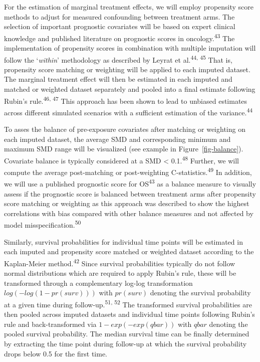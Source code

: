 \documentclass[
  letterpaper,
  DIV=11,
  numbers=noendperiod]{scrartcl}
\begin{document}
For the estimation of marginal treatment effects, we will employ
propensity score methods to adjust for measured confounding between
treatment arms. The selection of important prognostic covariates will be
based on expert clinical knowledge and published literature on
prognostic scores in oncology.\textsuperscript{43} The implementation of
propensity scores in combination with multiple imputation will follow
the `\emph{within}' methodology as described by Leyrat et
al.\textsuperscript{44, 45} That is, propensity score matching or
weighting will be applied to each imputed dataset. The marginal
treatment effect will then be estimated in each imputed and matched or
weighted dataset separately and pooled into a final estimate following
Rubin's rule.\textsuperscript{46, 47} This approach has been shown to
lead to unbiased estimates across different simulated scenarios with a
sufficient estimation of the variance.\textsuperscript{44}

To asses the balance of pre-exposure covariates after matching or
weighting on each imputed dataset, the average SMD and corresponding
minimum and maximum SMD range will be visualized (see example in
Figure~\ref{fig-balance}). Covariate balance is typically considered at
a SMD \textless{} 0.1.\textsuperscript{48} Further, we will compute the
average post-matching or post-weighting
C-statistics.\textsuperscript{49} In addition, we will use a published
prognostic score for OS\textsuperscript{43} as a balance measure to
visually assess if the prognostic score is balanced between treatment
arms after propensity score matching or weighting as this approach was
described to show the highest correlations with bias compared with other
balance measures and not affected by model
misspecification.\textsuperscript{50}

Similarly, survival probabilities for individual time points will be
estimated in each imputed and propensity score matched or weighted
dataset according to the Kaplan-Meier method.\textsuperscript{42} Since
survival probabilities typically do not follow normal distributions
which are required to apply Rubin's rule, these will be transformed
through a complementary log-log transformation \(log(-log(1-pr(surv)))\)
with \(pr(surv)\) denoting the survival probability at a given time
during follow-up.\textsuperscript{51, 52} The transformed survival
probabilities are then pooled across imputed datasets and individual
time points following Rubin's rule and back-transformed via
\(1-exp(-exp(qbar))\) with \(qbar\) denoting the pooled survival
probability. The median survival time can be finally determined by
extracting the time point during follow-up at which the survival
probability drops below 0.5 for the first time.
\end{document}
